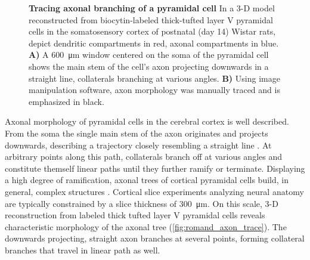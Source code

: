 \begin{figure}[!htbp]
  \centering 
  \caption{\textbf{Tracing axonal branching of a pyramidal cell} In a
    3-D model reconstructed from biocytin-labeled thick-tufted layer V
    pyramidal cells in the somatosensory cortex of postnatal (day 14)
    Wistar rats, \textcite{Romand2011} depict dendritic compartments in
    red, axonal compartments in blue.  \textbf{A)} A
    \SI{600}{\micro\meter} window centered on the soma of the pyramidal
    cell shows the main stem of the cell's axon projecting downwards in a
    straight line, collaterals branching at various angles. \textbf{B)}
    Using image manipulation software, axon morphology was manually traced
    and is emphasized in black.}    
  \label{fig:romand_axon_trace}
\end{figure}
\vspace{-0.2cm}

Axonal morphology of pyramidal cells in the cerebral cortex is well
described. From the soma the single main stem of the axon
originates and projects downwards, describing a trajectory closely
resembling a straight line \parencite{Braitenberg_Cortex}. At
arbitrary points along this path, collaterals branch off at various
angles and constitute themself linear paths until they further ramify
or terminate. Displaying a high degree of ramification, axonal trees
of cortical pyramidal cells build, in general, complex
structures \parencite{Petersen2003,Ramaswamy2012}. Cortical slice
experiments analyzing neural anatomy are typically constrained by a
slice thickness of \SI{300}{\micro\meter}. On this scale, 3-D
reconstruction from labeled thick tufted layer V pyramidal cells
reveals characteristic morphology of the axonal tree
(\autoref{fig:romand_axon_trace}). The downwards projecting, straight
axon branches at several points, forming collateral branches that
travel in linear path as well.

